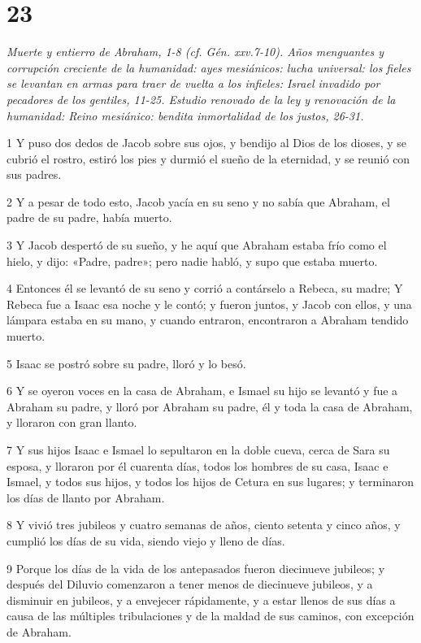 \chapter{23}

\par \textit{Muerte y entierro de Abraham, 1-8 (cf. Gén. xxv.7-10). Años menguantes y corrupción creciente de la humanidad: ayes mesiánicos: lucha universal: los fieles se levantan en armas para traer de vuelta a los infieles: Israel invadido por pecadores de los gentiles, 11-25. Estudio renovado de la ley y renovación de la humanidad: Reino mesiánico: bendita inmortalidad de los justos, 26-31.}

\par 1 Y puso dos dedos de Jacob sobre sus ojos, y bendijo al Dios de los dioses, y se cubrió el rostro, estiró los pies y durmió el sueño de la eternidad, y se reunió con sus padres.
\par 2 Y a pesar de todo esto, Jacob yacía en su seno y no sabía que Abraham, el padre de su padre, había muerto.
\par 3 Y Jacob despertó de su sueño, y he aquí que Abraham estaba frío como el hielo, y dijo: «Padre, padre»; pero nadie habló, y supo que estaba muerto.
\par 4 Entonces él se levantó de su seno y corrió a contárselo a Rebeca, su madre; Y Rebeca fue a Isaac esa noche y le contó; y fueron juntos, y Jacob con ellos, y una lámpara estaba en su mano, y cuando entraron, encontraron a Abraham tendido muerto.
\par 5 Isaac se postró sobre su padre, lloró y lo besó.
\par 6 Y se oyeron voces en la casa de Abraham, e Ismael su hijo se levantó y fue a Abraham su padre, y lloró por Abraham su padre, él y toda la casa de Abraham, y lloraron con gran llanto.
\par 7 Y sus hijos Isaac e Ismael lo sepultaron en la doble cueva, cerca de Sara su esposa, y lloraron por él cuarenta días, todos los hombres de su casa, Isaac e Ismael, y todos sus hijos, y todos los hijos de Cetura en sus lugares; y terminaron los días de llanto por Abraham.
\par 8 Y vivió tres jubileos y cuatro semanas de años, ciento setenta y cinco años, y cumplió los días de su vida, siendo viejo y lleno de días.
\par 9 Porque los días de la vida de los antepasados ​​fueron diecinueve jubileos; y después del Diluvio comenzaron a tener menos de diecinueve jubileos, y a disminuir en jubileos, y a envejecer rápidamente, y a estar llenos de sus días a causa de las múltiples tribulaciones y de la maldad de sus caminos, con excepción de Abraham.
